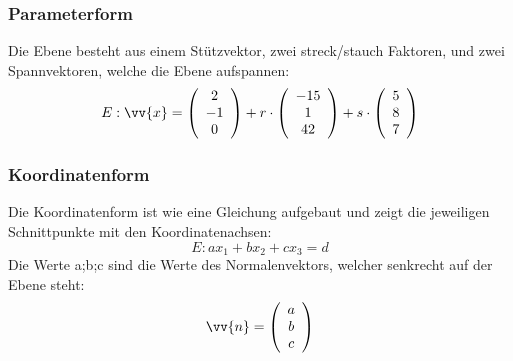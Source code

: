\documentclass[a4paper, 15pt]{article}
\begin{document}
\subsubsection{Parameterform}
Die Ebene besteht aus einem Stützvektor, zwei streck/stauch Faktoren, und zwei Spannvektoren, welche die Ebene aufspannen:
\begin{equation*}
E:\vv{x} = \left(\begin{array}{c} 2 \\ -1 \\ 0 \end{array}\right) + r \cdot \left(\begin{array}{c} -15 \\ 1 \\ 42 \end{array}\right) + s \cdot \left(\begin{array}{c} 5 \\ 8 \\ 7 \end{array}\right)
\end{equation*}
\subsubsection{Koordinatenform}
Die Koordinatenform ist wie eine Gleichung aufgebaut und zeigt die jeweiligen Schnittpunkte mit den Koordinatenachsen:
\begin{equation*}
E: ax_1 + bx_2 + cx_3 = d
\end{equation*}
Die Werte a;b;c sind die Werte des Normalenvektors, welcher senkrecht auf der Ebene steht:
\begin{equation*}
\vv{n} = \left(\begin{array}{c} a \\ b \\ c \end{array}\right)
\end{equation*}
\end{document}
